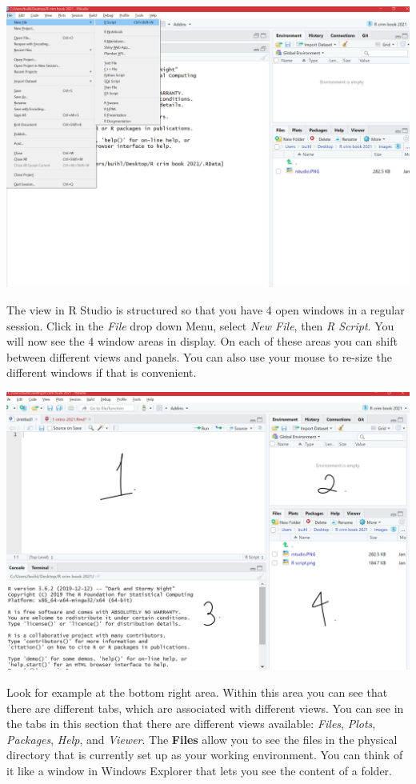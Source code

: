\documentclass[]{book}
\begin{document}
\includegraphics{img/openscript.png}

The view in R Studio is structured so that you have 4 open windows in a regular session. Click in the \emph{File} drop down Menu, select \emph{New File}, then \emph{R Script}. You will now see the 4 window areas in display. On each of these areas you can shift between different views and panels. You can also use your mouse to re-size the different windows if that is convenient.

\includegraphics{img/the4views.png}

Look for example at the bottom right area. Within this area you can see that there are different tabs, which are associated with different views. You can see in the tabs in this section that there are different views available: \emph{Files}, \emph{Plots}, \emph{Packages}, \emph{Help}, and \emph{Viewer}. The \textbf{Files} allow you to see the files in the physical directory that is currently set up as your working environment. You can think of it like a window in Windows Explorer that lets you see the content of a folder.
\end{document}
